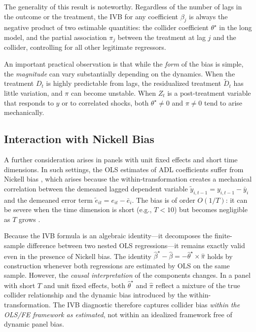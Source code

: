 \documentclass[
]{article}
\begin{document}
The generality of this result is noteworthy. Regardless of the number of
lags in the outcome or the treatment, the IVB for any coefficient
\(\beta_j\) is always the negative product of two estimable quantities:
the collider coefficient \(\theta^{\star}\) in the long model, and the
partial association \(\pi_j\) between the treatment at lag \(j\) and the
collider, controlling for all other legitimate regressors.

An important practical observation is that while the \emph{form} of the
bias is simple, the \emph{magnitude} can vary substantially depending on
the dynamics. When the treatment \(D_t\) is highly predictable from
lags, the residualized treatment \(\tilde{D}_t\) has little variation,
and \(\pi\) can become unstable. When \(Z_t\) is a post-treatment
variable that responds to \(y\) or to correlated shocks, both
\(\theta^{\star} \neq 0\) and \(\pi \neq 0\) tend to arise mechanically.

\subsection{\texorpdfstring{Interaction with Nickell Bias
\label{sec:nickell}}{Interaction with Nickell Bias }}\label{interaction-with-nickell-bias}

A further consideration arises in panels with unit fixed effects and
short time dimensions. In such settings, the OLS estimates of ADL
coefficients suffer from Nickell bias \citep{nickell1981biases}, which
arises because the within-transformation creates a mechanical
correlation between the demeaned lagged dependent variable
\(\tilde{y}_{i,t-1} = y_{i,t-1} - \bar{y}_i\) and the demeaned error
term \(\tilde{e}_{it} = e_{it} - \bar{e}_i\). The bias is of order
\(O(1/T)\): it can be severe when the time dimension is short (e.g.,
\(T < 10\)) but becomes negligible as \(T\) grows
\citep{judson_owen1999}.

Because the IVB formula is an algebraic identity---it decomposes the
finite-sample difference between two nested OLS regressions---it remains
exactly valid even in the presence of Nickell bias. The identity
\(\hat{\beta}^{\star} - \hat{\beta} = -\hat{\theta}^{\star} \times \hat{\pi}\)
holds by construction whenever both regressions are estimated by OLS on
the same sample. However, the \textit{causal interpretation} of the
components changes. In a panel with short \(T\) and unit fixed effects,
both \(\hat{\theta}^{\star}\) and \(\hat{\pi}\) reflect a mixture of the
true collider relationship and the dynamic bias introduced by the
within-transformation. The IVB diagnostic therefore captures collider
bias \textit{within the OLS/FE framework as estimated}, not within an
idealized framework free of dynamic panel bias.
\end{document}

